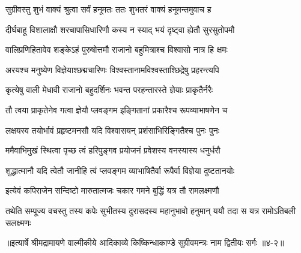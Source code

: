\twolineshloka
{सुग्रीवस्तु शुभं वाक्यं श्रुत्वा सर्वं हनूमतः}
{ततः शुभतरं वाक्यं हनूमन्तमुवाच ह} %

\twolineshloka
{दीर्घबाहू विशालाक्षौ शरचापासिधारिणौ}
{कस्य न स्याद् भयं दृष्ट्वा ह्येतौ सुरसुतोपमौ} %

\twolineshloka
{वालिप्रणिहितावेव शङ्केऽहं पुरुषोत्तमौ}
{राजानो बहुमित्राश्च विश्वासो नात्र हि क्षमः} %

\twolineshloka
{अरयश्च मनुष्येण विज्ञेयाश्छद्मचारिणः}
{विश्वस्तानामविश्वस्ताश्छिद्रेषु प्रहरन्त्यपि} %

\twolineshloka
{कृत्येषु वाली मेधावी राजानो बहुदर्शिनः}
{भवन्त परहन्तारस्ते ज्ञेयाः प्राकृतैर्नरैः} %

\twolineshloka
{तौ त्वया प्राकृतेनेव गत्वा ज्ञेयौ प्लवङ्गम}
{इङ्गितानां प्रकारैश्च रूपव्याभाषणेन च} %

\twolineshloka
{लक्षयस्व तयोर्भावं प्रहृष्टमनसौ यदि}
{विश्वासयन् प्रशंसाभिरिङ्गितैश्च पुनः पुनः} %

\twolineshloka
{ममैवाभिमुखं स्थित्वा पृच्छ त्वं हरिपुङ्गव}
{प्रयोजनं प्रवेशस्य वनस्यास्य धनुर्धरौ} %

\twolineshloka
{शुद्धात्मानौ यदि त्वेतौ जानीहि त्वं प्लवङ्गम}
{व्याभाषितैर्वा रूपैर्वा विज्ञेया दुष्टतानयोः} %

\twolineshloka
{इत्येवं कपिराजेन सन्दिष्टो मारुतात्मजः}
{चकार गमने बुद्धिं यत्र तौ रामलक्ष्मणौ} %

\twolineshloka
{तथेति सम्पूज्य वचस्तु तस्य कपेः सुभीतस्य दुरासदस्य}
{महानुभावो हनुमान् ययौ तदा स यत्र रामोऽतिबली सलक्ष्मणः} %


॥इत्यार्षे श्रीमद्रामायणे वाल्मीकीये आदिकाव्ये किष्किन्धाकाण्डे सुग्रीवमन्त्रः नाम द्वितीयः सर्गः ॥४-२॥

